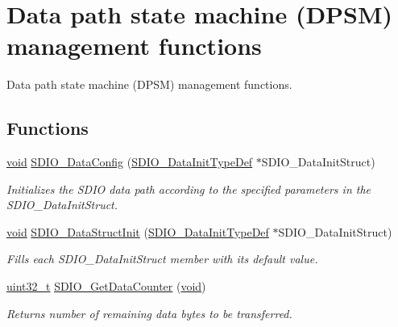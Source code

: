 \hypertarget{group___s_d_i_o___group3}{\section{Data path state machine (D\-P\-S\-M) management functions}
\label{group___s_d_i_o___group3}
}


Data path state machine (D\-P\-S\-M) management functions.  


\subsection*{Functions}
\begin{DoxyCompactItemize}
\item 
\hyperlink{group___n_a_m_e_ga18028b8badbf1ea7e704ccac3c488e82}{void} \hyperlink{group___s_d_i_o___group3_gad65d896ae919683585bda44a1e2afae4}{S\-D\-I\-O\-\_\-\-Data\-Config} (\hyperlink{struct_s_d_i_o___data_init_type_def}{S\-D\-I\-O\-\_\-\-Data\-Init\-Type\-Def} $\ast$S\-D\-I\-O\-\_\-\-Data\-Init\-Struct)
\begin{DoxyCompactList}\small\item\em Initializes the S\-D\-I\-O data path according to the specified parameters in the S\-D\-I\-O\-\_\-\-Data\-Init\-Struct. \end{DoxyCompactList}\item 
\hyperlink{group___n_a_m_e_ga18028b8badbf1ea7e704ccac3c488e82}{void} \hyperlink{group___s_d_i_o___group3_gaa83209c09e921521aca2587fb5b22ea2}{S\-D\-I\-O\-\_\-\-Data\-Struct\-Init} (\hyperlink{struct_s_d_i_o___data_init_type_def}{S\-D\-I\-O\-\_\-\-Data\-Init\-Type\-Def} $\ast$S\-D\-I\-O\-\_\-\-Data\-Init\-Struct)
\begin{DoxyCompactList}\small\item\em Fills each S\-D\-I\-O\-\_\-\-Data\-Init\-Struct member with its default value. \end{DoxyCompactList}\item 
\hyperlink{stdint_8h_a435d1572bf3f880d55459d9805097f62}{uint32\-\_\-t} \hyperlink{group___s_d_i_o___group3_ga7a28aaa2c25a9a5a8db1f49b0e8c9d0a}{S\-D\-I\-O\-\_\-\-Get\-Data\-Counter} (\hyperlink{group___n_a_m_e_ga18028b8badbf1ea7e704ccac3c488e82}{void})
\begin{DoxyCompactList}\small\item\em Returns number of remaining data bytes to be transferred. \end{DoxyCompactList}\item 

\end{DoxyCompactItemize}
